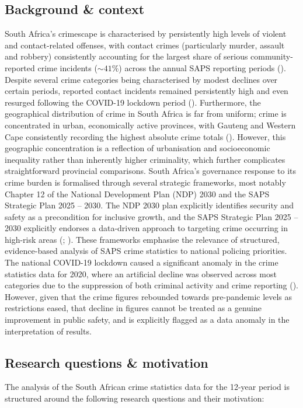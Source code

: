 \documentclass[titlepage, 12pt, oneside]{article}
\numberwithin{equation}{section}
\begin{document}
	\subsection{Background \& context}
    South Africa's crimescape is characterised by persistently high levels of violent and contact-related offenses, with contact crimes (particularly murder, assault and robbery) consistently accounting for the largest share of serious community-reported crime incidents ($\sim41\%$) across the annual SAPS reporting periods (\cite{iss}). Despite several crime categories being characterised by modest declines over certain periods, reported contact incidents remained persistently high and even resurged following the COVID-19 lockdown period (\cite{iss}). Furthermore, the geographical distribution of crime in South Africa is far from uniform; crime is concentrated in urban, economically active provinces, with Gauteng and Western Cape consistently recording the highest absolute crime totals (\cite{saps2023}). However, this geographic concentration is a reflection of urbanisation and socioeconomic inequality rather than inherently higher criminality, which further complicates straightforward provincial comparisons. South Africa's governance response to its crime burden is formalised through several strategic frameworks, most notably Chapter 12 of the National Development Plan (NDP) 2030 and the SAPS Strategic Plan 2025 -- 2030. The NDP 2030 plan explicitly identifies security and safety as a precondition for inclusive growth, and the SAPS Strategic Plan 2025 -- 2030 explicitly endorses a data-driven approach to targeting crime occurring in high-risk areas (\cite{ndp2030}; \cite{saps2025}). These frameworks emphasise the relevance of structured, evidence-based analysis of SAPS crime statistics to national policing priorities. The national COVID-19 lockdown caused a significant anomaly in the crime statistics data for 2020, where an artificial decline was observed across most categories due to the suppression of both criminal activity and crime reporting (\cite{faull2021}). However, given that the crime figures rebounded towards pre-pandemic levels as restrictions eased, that decline in figures cannot be treated as a genuine improvement in public safety, and is explicitly flagged as a data anomaly in the interpretation of results. 
	
	\subsection{Research questions \& motivation}
	The analysis of the South African crime statistics data for the 12-year period is structured around the following research questions and their motivation:
	
\end{document}
